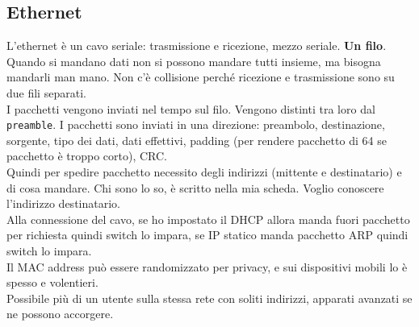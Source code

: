 \documentclass[10pt]{book}
\begin{document}
\subsection{Ethernet}
L'ethernet è un cavo seriale: trasmissione e ricezione, mezzo seriale. \textbf{Un filo}.\\
Quando si mandano dati non si possono mandare tutti insieme, ma bisogna mandarli man mano. Non c'è collisione perché ricezione e trasmissione sono su due fili separati.\\
I pacchetti vengono inviati nel tempo sul filo. Vengono distinti tra loro dal \texttt{preamble}. I pacchetti sono inviati in una direzione: preambolo, destinazione, sorgente, tipo dei dati, dati effettivi, padding (per rendere pacchetto di 64 se pacchetto è troppo corto), CRC.\\
Quindi per spedire pacchetto necessito degli indirizzi (mittente e destinatario) e di cosa mandare. Chi sono lo so, è scritto nella mia scheda. Voglio conoscere l'indirizzo destinatario.\\
Alla connessione del cavo, se ho impostato il DHCP allora manda fuori pacchetto per richiesta quindi switch lo impara, se IP statico manda pacchetto ARP quindi switch lo impara.\\
Il MAC address può essere randomizzato per privacy, e sui dispositivi mobili lo è spesso e volentieri.\\
Possibile più di un utente sulla stessa rete con soliti indirizzi, apparati avanzati se ne possono accorgere.
\end{document}
